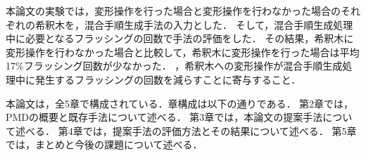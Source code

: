 本論文の実験では，変形操作を行った場合と変形操作を行わなかった場合のそれぞれの希釈木を，混合手順生成手法の入力とした．
そして，混合手順生成処理中に必要となるフラッシングの回数で手法の評価をした．
その結果，希釈木に変形操作を行わなかった場合と比較して，希釈木に変形操作を行った場合は平均17\%フラッシング回数が少なかった．
，希釈木への変形操作が混合手順生成処理中に発生するフラッシングの回数を減らすことに寄与すること．

本論文は，全5章で構成されている．章構成は以下の通りである．
第2章では，PMDの概要と既存手法について述べる．
第3章では，本論文の提案手法について述べる．
第4章では，提案手法の評価方法とその結果について述べる．
第5章では，まとめと今後の課題について述べる．

% 
